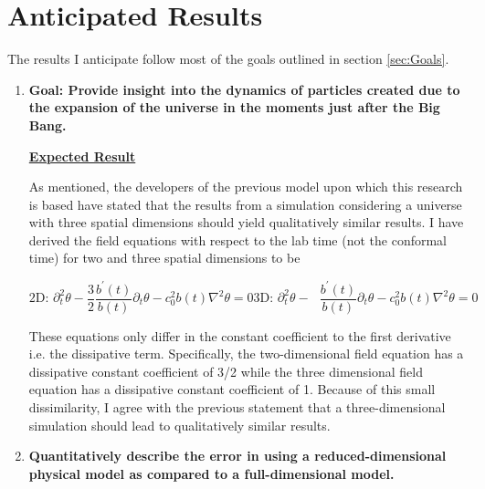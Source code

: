\documentclass{article}
\begin{document}
    \section{Anticipated Results}

        The results I anticipate follow most of the goals outlined in section \ref{sec:Goals}.

        \begin{enumerate}
            \item \textbf{Goal: Provide insight into the dynamics of particles created due to the expansion of the universe in the moments just after the Big Bang.}

            \underline{\textbf{Expected Result}}

                As mentioned, the developers of the previous model upon which this research is based\cite{Jain} have stated that the results from a simulation considering a universe with three spatial dimensions should yield qualitatively similar results.  I have derived the field equations with respect to the lab time (not the conformal time) for two and three spatial dimensions to be 

                \begin{subequations}
                \begin{equation}
                    \text{2D: } \partial_t^2\theta - \frac{3}{2} \frac{b^\prime(t)}{b(t)} \partial_t \theta - c_0^2 b(t) \nabla^2\theta = 0
                \end{equation}
                \begin{equation}
                    \text{3D: } \partial_t^2\theta - \phantom{\frac{3}{2}} \frac{b^\prime(t)}{b(t)} \partial_t \theta - c_0^2 b(t) \nabla^2\theta = 0
                \end{equation}
                \end{subequations}

                These equations only differ in the constant coefficient to the first derivative i.e. the dissipative term.  Specifically, the two-dimensional field equation has a dissipative constant coefficient of 3/2 while the three dimensional field equation has a dissipative constant coefficient of 1.  Because of this small dissimilarity, I agree with the previous statement that a three-dimensional simulation should lead to qualitatively similar results.
            
            \item \textbf{Quantitatively describe the error in using a reduced-dimensional physical model as compared to a full-dimensional model.}
            

\end{enumerate}
\end{document}
